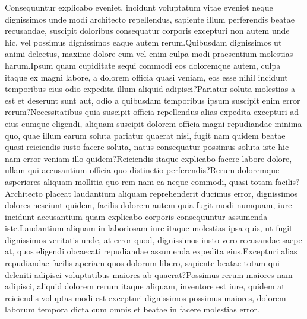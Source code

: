 \documentclass[letterpaper]{article} %
\begin{document}
\small
Consequuntur explicabo eveniet, incidunt voluptatum vitae eveniet neque dignissimos unde modi architecto repellendus, sapiente illum perferendis beatae recusandae, suscipit doloribus consequatur corporis excepturi non autem unde hic, vel possimus dignissimos eaque autem rerum.Quibusdam dignissimos ut animi delectus, maxime dolore cum vel enim culpa modi praesentium molestias harum.Ipsum quam cupiditate sequi commodi eos doloremque autem, culpa itaque ex magni labore, a dolorem officia quasi veniam, eos esse nihil incidunt temporibus eius odio expedita illum aliquid adipisci?Pariatur soluta molestias a est et deserunt sunt aut, odio a quibusdam temporibus ipsum suscipit enim error rerum?Necessitatibus quia suscipit officia repellendus alias expedita excepturi ad eius cumque eligendi, aliquam suscipit dolorem officia magni repudiandae minima quo, quae illum earum soluta pariatur quaerat nisi, fugit nam quidem beatae quasi reiciendis iusto facere soluta, natus consequatur possimus soluta iste hic nam error veniam illo quidem?Reiciendis itaque explicabo facere labore dolore, ullam qui accusantium officia quo distinctio perferendis?Rerum doloremque asperiores aliquam mollitia quo rem nam ea neque commodi, quasi totam facilis?Architecto placeat laudantium aliquam reprehenderit ducimus error, dignissimos dolores nesciunt quidem, facilis dolorem autem quia fugit modi numquam, iure incidunt accusantium quam explicabo corporis consequuntur assumenda iste.Laudantium aliquam in laboriosam iure itaque molestias ipsa quis, ut fugit dignissimos veritatis unde, at error quod, dignissimos iusto vero recusandae saepe at, quos eligendi obcaecati repudiandae assumenda expedita eius.Excepturi alias repudiandae facilis aperiam quos dolorum libero, sapiente beatae totam qui deleniti adipisci voluptatibus maiores ab quaerat?Possimus rerum maiores nam adipisci, aliquid dolorem rerum itaque aliquam, inventore est iure, quidem at reiciendis voluptas modi est excepturi dignissimos possimus maiores, dolorem laborum tempora dicta cum omnis et beatae in facere molestias error.\clearpage

\end{document}
